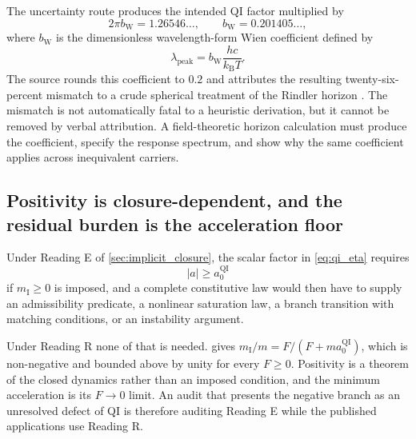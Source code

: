 \documentclass[11pt]{article}
\newcommand{\QI}{\mathrm{QI}}
\begin{document}
The uncertainty route produces the intended QI factor multiplied by
\begin{equation}
    2\pi b_{\mathrm W}
    =1.26546\ldots,
    \qquad
    b_{\mathrm W}=0.201405\ldots,
    \label{eq:wien_factor}
\end{equation}
where \(b_{\mathrm W}\) is the dimensionless wavelength-form Wien coefficient defined by
\begin{equation}
    \lambda_{\mathrm{peak}}
    =b_{\mathrm W}\frac{hc}{k_{\mathrm B}T}.
\end{equation}
The source rounds this coefficient to \(0.2\) and attributes the resulting twenty-six-percent mismatch to a crude spherical treatment of the Rindler horizon \cite{McCulloch2016}. The mismatch is not automatically fatal to a heuristic derivation, but it cannot be removed by verbal attribution. A field-theoretic horizon calculation must produce the coefficient, specify the response spectrum, and show why the same coefficient applies across inequivalent carriers.

\subsection{Positivity is closure-dependent, and the residual burden is the acceleration floor}
\label{sec:positivity_revised}

Under Reading E of \cref{sec:implicit_closure}, the scalar factor in \cref{eq:qi_eta} requires
\begin{equation}
    |a|\ge a_{0}^{\QI}
\end{equation}
if \(m_{\mathrm I}\ge0\) is imposed, and a complete constitutive law would then have to supply an admissibility predicate, a nonlinear saturation law, a branch transition with matching conditions, or an instability argument.

Under Reading R none of that is needed.  gives \(m_{\mathrm I}/m=F/(F+ma_{0}^{\QI})\), which is non-negative and bounded above by unity for every \(F\ge0\). Positivity is a theorem of the closed dynamics rather than an imposed condition, and the minimum acceleration is its \(F\to0\) limit. An audit that presents the negative branch as an unresolved defect of QI is therefore auditing Reading E while the published applications use Reading R.
\end{document}
